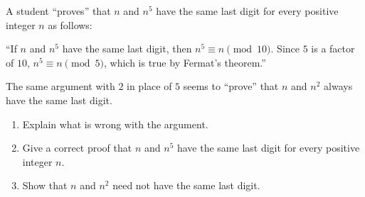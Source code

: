 A student ``proves'' that $n$ and $n^5$ have the same last digit for every positive integer $n$ as follows:

``If $n$ and $n^5$ have the same last digit, then $n^5\equiv n\pmod{10}$. Since $5$ is a factor of $10$, $n^5\equiv n\pmod5$, which is true by Fermat's theorem.''

The same argument with $2$ in place of $5$ seems to ``prove'' that $n$ and $n^2$ always have the same last digit.
\begin{enumerate}
\item[(a)] Explain what is wrong with the argument.
\item[(b)] Give a correct proof that $n$ and $n^5$ have the same last digit for every positive integer $n$.
\item[(c)] Show that $n$ and $n^2$ need not have the same last digit.
\end{enumerate}
